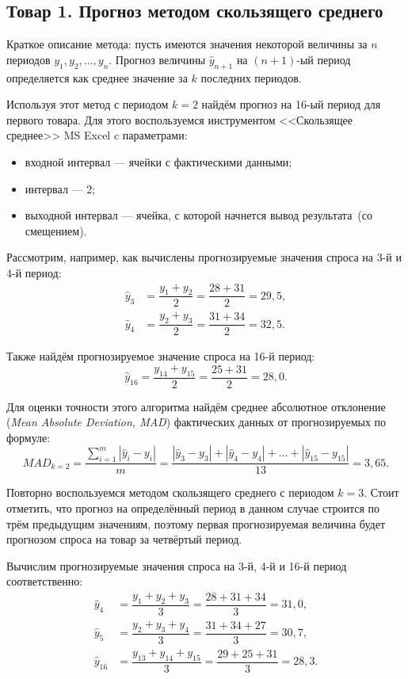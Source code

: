 \subsection{Товар 1. Прогноз методом скользящего среднего}

Краткое описание метода: пусть имеются значения некоторой
величины за $n$ периодов $y_1, y_2, \dots, y_n$.
Прогноз величины $\hat{y}_{n+1}$ на $(n+1)\text{-ый}$ период определяется как
среднее значение за $k$ последних периодов.

Используя этот метод с периодом $k=2$ найдём прогноз на 16-ый период
для первого товара. Для этого воспользуемся инструментом
<<Скользящее среднее>> MS Excel c параметрами:
\begin{itemize}
  \item входной интервал --- ячейки с фактическими данными;
  \item интервал --- 2;
  \item выходной интервал --- ячейка, с которой начнется вывод результата~(со смещением).
\end{itemize}


Рассмотрим, например, как вычислены прогнозируемые значения спроса на 3-й и 4-й период:
\begin{align*}
  \hat{y}_3 &= \dfrac{y_1 + y_2}{2} = \dfrac{28 + 31}{2} = 29{,}5, \\
  \hat{y}_4 &= \dfrac{y_2 + y_3}{2} = \dfrac{31 + 34}{2} = 32{,}5.
\end{align*}

Также найдём прогнозируемое значение спроса на 16-й период:
\begin{equation*}
  \hat{y}_{16} = \dfrac{y_{14} + y_{15}}{2} = \dfrac{25 + 31}{2} = 28{,}0.
\end{equation*}

Для оценки точности этого алгоритма найдём среднее абсолютное отклонение
(\textit{Mean Absolute Deviation, MAD}) фактических данных от прогнозируемых по формуле:
\[
  MAD_{k=2} = \dfrac{\sum_{i=1}^{m} |\hat{y}_i - y_i| }{m} = \dfrac{|\hat{y}_3 - y_3| + |\hat{y}_4 - y_4| + \dots + |\hat{y}_{15} - y_{15}|}{13} = 3{,}65.
\]

Повторно воспользуемся методом скользящего среднего с периодом $k=3$.
Стоит отметить, что прогноз на определённый период в данном случае строится
по трём предыдущим значениям, поэтому первая прогнозируемая величина будет
прогнозом спроса на товар за четвёртый период.

Вычислим прогнозируемые значения спроса на 3-й, 4-й и 16-й период соответственно:
\begin{align*}
  \hat{y}_4 &= \dfrac{y_1 + y_2 + y_3}{3} = \dfrac{28 + 31 + 34}{3} = 31{,}0, \\
  \hat{y}_5 &= \dfrac{y_2 + y_3 + y_4}{3} = \dfrac{31 + 34 + 27}{3} = 30{,}7, \\
  \hat{y}_{16} &= \dfrac{y_{13} + y_{14} + y_{15}}{3} = \dfrac{29 + 25 + 31}{3} = 28{,}3.
\end{align*}

